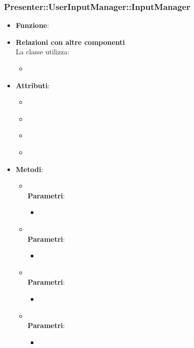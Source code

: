 \subsubsection{Presenter::UserInputManager::InputManager}
\begin{itemize}
\item\textbf{Funzione}:
\item\textbf{Relazioni con altre componenti}\\
La classe utilizza:
	\begin{itemize}
		\item
	\end{itemize}
\item\textbf{Attributi}:
	\begin{itemize}
		\item\code{}\\
		\item\code{}\\
		\item\code{}\\
		\item\code{}\\
	\end{itemize}
\item\textbf{Metodi}:
	\begin{itemize}
		\item\code{}\\
		\textbf{Parametri}:
			\begin{itemize}
				\item\code{}\\
			\end{itemize}
		\item\code{}\\
		\textbf{Parametri}:
			\begin{itemize}
				\item\code{}\\
			\end{itemize}
		\item\code{}\\
		\textbf{Parametri}:
			\begin{itemize}
				\item\code{}\\
			\end{itemize}
		\item\code{}\\
		\textbf{Parametri}:
			\begin{itemize}
				\item\code{}\\
			\end{itemize}
	\end{itemize}
\end{itemize}

